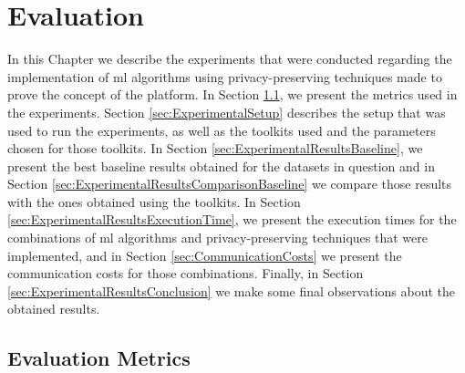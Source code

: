 %

\acresetall

\chapter{Evaluation}
\label{ch:Evaluation}

In this Chapter we describe the experiments that were conducted regarding the implementation of \ac{ml} algorithms using privacy-preserving techniques made to prove the concept of the platform. In Section \ref{sec:EvaluationMetrics}, we present the metrics used in the experiments. Section \ref{sec:ExperimentalSetup} describes the setup that was used to run the experiments, as well as the toolkits used and the parameters chosen for those toolkits. In Section \ref{sec:ExperimentalResultsBaseline}, we present the best baseline results obtained for the datasets in question and in Section \ref{sec:ExperimentalResultsComparisonBaseline} we compare those results with the ones obtained using the toolkits. In Section \ref{sec:ExperimentalResultsExecutionTime}, we present the execution times for the combinations of \ac{ml} algorithms and privacy-preserving techniques that were implemented, and in Section \ref{sec:CommunicationCosts} we present the communication costs for those combinations. Finally, in Section \ref{sec:ExperimentalResultsConclusion} we make some final observations about the obtained results.



\section{Evaluation Metrics}
\label{sec:EvaluationMetrics}

